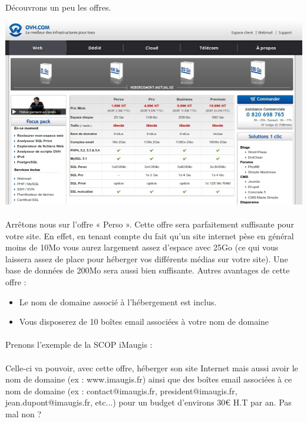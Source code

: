 \documentclass[10pt,a4paper]{article}
\begin{document}
\paragraph{}Découvrons un peu les offres.
\begin{center}
\includegraphics[scale=0.3]{img/0271.png}
\end{center}
\paragraph{}Arrêtons nous sur l'offre « Perso ». Cette offre sera parfaitement suffisante pour votre site. En effet, en tenant compte du fait qu'un site internet pèse en général moins de 10Mo vous aurez largement assez d'espace avec 25Go (ce qui vous laissera assez de place pour héberger vos différents médias sur votre site). Une base de données de 200Mo sera aussi bien suffisante. Autres avantages de cette offre :
\begin{itemize}
\item Le nom de domaine associé à l'hébergement est inclus.
\item Vous disposerez de 10 boîtes email associées à votre nom de domaine
\end{itemize}
\paragraph{}Prenons l’exemple de la SCOP iMaugis :
\paragraph{}Celle-ci va pouvoir, avec cette offre, héberger son site Internet mais aussi avoir le nom de domaine (ex : www.imaugis.fr) ainsi que des boîtes email associées à ce nom de domaine (ex : contact@imaugis.fr, president@imaugis.fr, jean.dupont@imaugis.fr, etc...) pour un budget d'environs 30\euro{} H.T par an. Pas mal non ?
\end{document}
